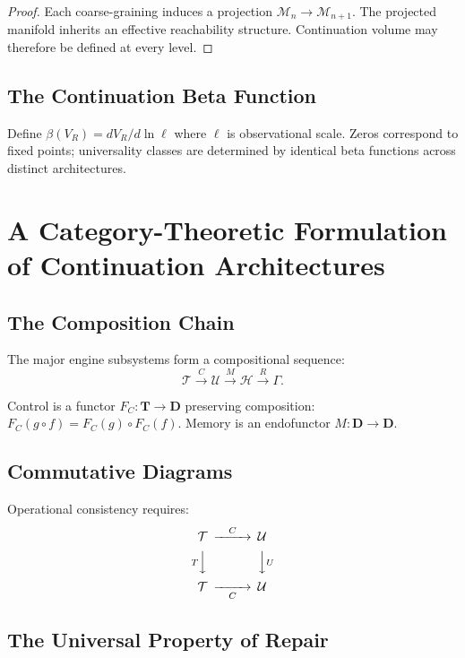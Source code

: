 \documentclass[12pt,a4paper]{article}
\newcommand{\M}{\mathcal{M}}
\begin{document}
\begin{proof}
Each coarse-graining induces a projection $\M_n \to \M_{n+1}$. The projected manifold inherits an effective reachability structure. Continuation volume may therefore be defined at every level.
\end{proof}

\subsection{The Continuation Beta Function}

Define $\beta(V_R) = dV_R/d\ln\ell$ where $\ell$ is observational scale. Zeros correspond to fixed points; universality classes are determined by identical beta functions across distinct architectures.

\section{A Category-Theoretic Formulation of Continuation Architectures}

\subsection{The Composition Chain}

The major engine subsystems form a compositional sequence:
\[
\mathcal{T} \overset{C}{\longrightarrow} \mathcal{U} \overset{M}{\longrightarrow} \mathcal{H} \overset{R}{\longrightarrow} \Gamma.
\]

Control is a functor $F_C : \mathbf{T} \to \mathbf{D}$ preserving composition: $F_C(g \circ f) = F_C(g) \circ F_C(f)$. Memory is an endofunctor $M : \mathbf{D} \to \mathbf{D}$.

\subsection{Commutative Diagrams}

Operational consistency requires:
\[
\begin{CD}
\mathcal{T} @>C>> \mathcal{U} \\
@V{T}V{}V       @V{}V{U}V \\
\mathcal{T} @>>C> \mathcal{U}
\end{CD}
\]

\subsection{The Universal Property of Repair}
\end{document}
